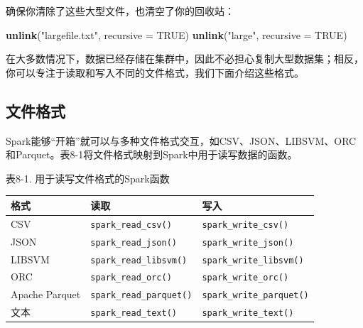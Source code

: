 \documentclass[
]{article}
\newenvironment{Shaded}{\begin{snugshade}}{\end{snugshade}}
\newcommand{\ControlFlowTok}[1]{\textcolor[rgb]{0.13,0.29,0.53}{\textbf{#1}}}
\newcommand{\DataTypeTok}[1]{\textcolor[rgb]{0.13,0.29,0.53}{#1}}
\newcommand{\DecValTok}[1]{\textcolor[rgb]{0.00,0.00,0.81}{#1}}
\newcommand{\KeywordTok}[1]{\textcolor[rgb]{0.13,0.29,0.53}{\textbf{#1}}}
\newcommand{\NormalTok}[1]{#1}
\newcommand{\OperatorTok}[1]{\textcolor[rgb]{0.81,0.36,0.00}{\textbf{#1}}}
\newcommand{\OtherTok}[1]{\textcolor[rgb]{0.56,0.35,0.01}{#1}}
\newcommand{\StringTok}[1]{\textcolor[rgb]{0.31,0.60,0.02}{#1}}
\begin{document}
\begin{Shaded}
\end{Shaded}

确保你清除了这些大型文件，也清空了你的回收站：

\begin{Shaded}
\begin{Highlighting}[]
\KeywordTok{unlink}\NormalTok{(}\StringTok{"largefile.txt"}\NormalTok{, }\DataTypeTok{recursive =} \OtherTok{TRUE}\NormalTok{)}
\KeywordTok{unlink}\NormalTok{(}\StringTok{"large"}\NormalTok{, }\DataTypeTok{recursive =} \OtherTok{TRUE}\NormalTok{)}
\end{Highlighting}
\end{Shaded}

在大多数情况下，数据已经存储在集群中，因此不必担心复制大型数据集；相反，你可以专注于读取和写入不同的文件格式，我们下面介绍这些格式。

\hypertarget{ux6587ux4ef6ux683cux5f0f}{%
\subsection{文件格式}\label{ux6587ux4ef6ux683cux5f0f}}

Spark能够``开箱''就可以与多种文件格式交互，如CSV、JSON、LIBSVM、ORC和Parquet。表8-1将文件格式映射到Spark中用于读写数据的函数。

表8-1. 用于读写文件格式的Spark函数

\begin{longtable}[]{@{}lll@{}}
\toprule
格式 & 读取 & 写入\tabularnewline
\midrule
\endhead
CSV & \texttt{spark\_read\_csv()} &
\texttt{spark\_write\_csv()}\tabularnewline
JSON & \texttt{spark\_read\_json()} &
\texttt{spark\_write\_json()}\tabularnewline
LIBSVM & \texttt{spark\_read\_libsvm()} &
\texttt{spark\_write\_libsvm()}\tabularnewline
ORC & \texttt{spark\_read\_orc()} &
\texttt{spark\_write\_orc()}\tabularnewline
Apache Parquet & \texttt{spark\_read\_parquet()} &
\texttt{spark\_write\_parquet()}\tabularnewline
文本 & \texttt{spark\_read\_text()} &
\texttt{spark\_write\_text()}\tabularnewline
\bottomrule
\end{longtable}
\end{document}
